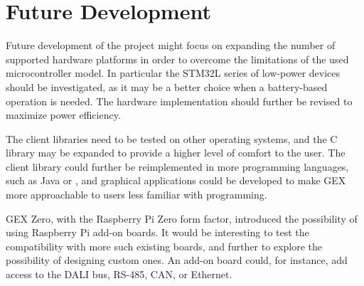 \section{Future Development}

Future development of the project might focus on expanding the number of supported hardware platforms in order to overcome the limitations of the used microcontroller model. In particular the STM32L series of low-power devices should be investigated, as it may be a better choice when a battery-based operation is needed. The hardware implementation should further be revised to maximize power efficiency.

The client libraries need to be tested on other operating systems, and the C library may be expanded to provide a higher level of comfort to the user. The client library could further be reimplemented in more programming languages, such as Java or \CS, and graphical applications could be developed to make GEX more approachable to users less familiar with programming.

GEX Zero, with the Raspberry Pi Zero form factor, introduced the possibility of using Raspberry Pi add-on boards. It would be interesting to test the compatibility with more such existing boards, and further to explore the possibility of designing custom ones. An add-on board could, for instance, add access to the \gls{DALI} bus, RS-485, \gls{CAN}, or Ethernet.





